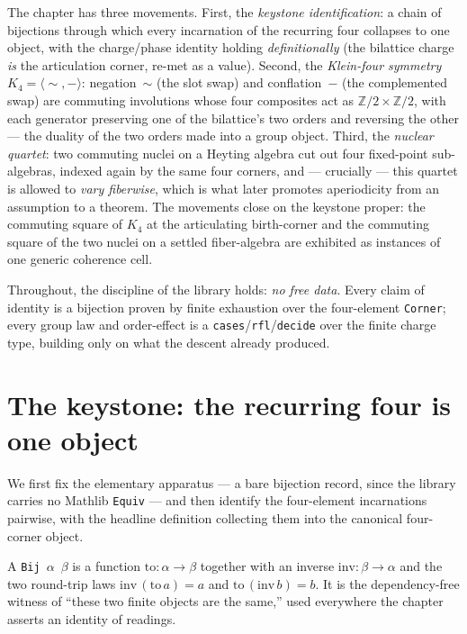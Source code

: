The chapter has three movements. First, the \emph{keystone identification}: a chain of bijections through which every incarnation of the recurring four collapses to one object, with the charge/phase identity holding \emph{definitionally} (the bilattice charge \emph{is} the articulation corner, re-met as a value). Second, the \emph{Klein-four symmetry} $K_4 = \langle{\sim},{-}\rangle$: negation~$\sim$ (the slot swap) and conflation~$-$ (the complemented swap) are commuting involutions whose four composites act as $\mathbb{Z}/2 \times \mathbb{Z}/2$, with each generator preserving one of the bilattice's two orders and reversing the other --- the duality of the two orders made into a group object. Third, the \emph{nuclear quartet}: two commuting nuclei on a Heyting algebra cut out four fixed-point sub-algebras, indexed again by the same four corners, and --- crucially --- this quartet is allowed to \emph{vary fiberwise}, which is what later promotes aperiodicity from an assumption to a theorem. The movements close on the keystone proper: the commuting square of $K_4$ at the articulating birth-corner and the commuting square of the two nuclei on a settled fiber-algebra are exhibited as instances of one generic coherence cell.

Throughout, the discipline of the library holds: \emph{no free data}. Every claim of identity is a bijection proven by finite exhaustion over the four-element \texttt{Corner}; every group law and order-effect is a \texttt{cases}/\texttt{rfl}/\texttt{decide} over the finite charge type, building only on what the descent already produced.

\section{The keystone: the recurring four is one object}

We first fix the elementary apparatus --- a bare bijection record, since the library carries no Mathlib \texttt{Equiv} --- and then identify the four-element incarnations pairwise, with the headline definition collecting them into the canonical four-corner object.

\begin{definition}\label{def:bij}\leanok
A \texttt{Bij}~$\alpha$~$\beta$ is a function $\mathrm{to} : \alpha \to \beta$ together with an inverse $\mathrm{inv} : \beta \to \alpha$ and the two round-trip laws $\mathrm{inv}\,(\mathrm{to}\,a) = a$ and $\mathrm{to}\,(\mathrm{inv}\,b) = b$. It is the dependency-free witness of ``these two finite objects are the same,'' used everywhere the chapter asserts an identity of readings.
\end{definition}

